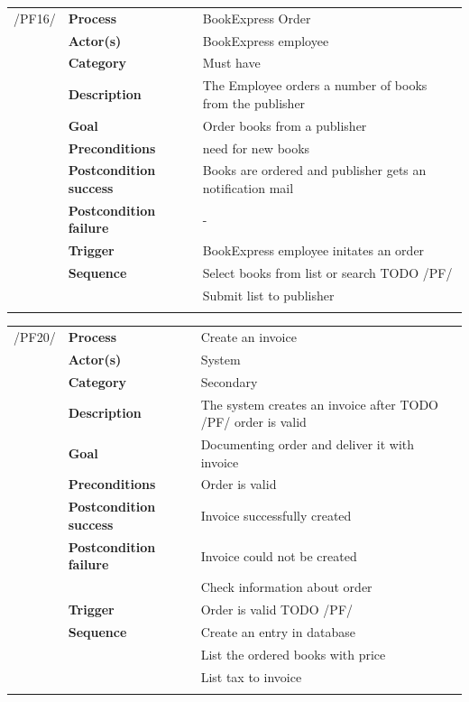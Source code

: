 \documentclass[11pt,a4paper,oneside,svgnames]{report}
\begin{document}
\noindent
\begin{tabular}{p{1.5cm}p{3cm}p{8cm}}
/PF16/	& \textbf{Process} & BookExpress Order\\
		& \textbf{Actor(s)} & BookExpress employee\\
		& \textbf{Category} & Must have\\
		& \textbf{Description}	 & The Employee orders a number of books from the publisher\\
		& \textbf{Goal} & Order books from a publisher\\
		& \textbf{Preconditions} & need for new books\\
		& \textbf{Postcondition success} & Books are ordered and publisher gets an notification mail\\
		& \textbf{Postcondition failure} & -\\
		& \textbf{Trigger} & BookExpress employee initates an order\\
		& \textbf{Sequence} & Select books from list or search TODO /PF/\\
		& & Submit list to publisher\\
		
\hfill \\
\end{tabular}

\noindent
\begin{tabular}{p{1.5cm}p{3cm}p{8cm}}
/PF20/	& \textbf{Process} & Create an invoice\\
		& \textbf{Actor(s)} & System\\
		& \textbf{Category} & Secondary\\
		& \textbf{Description}	 & The system creates an invoice after TODO /PF/ order is valid\\
		& \textbf{Goal} & Documenting order and deliver it with invoice\\
		& \textbf{Preconditions} & Order is valid\\
		& \textbf{Postcondition success} & Invoice successfully created\\
		& \textbf{Postcondition failure} & Invoice could not be created\\
		& & Check information about order\\
		& \textbf{Trigger} & Order is valid TODO /PF/\\
		& \textbf{Sequence} & Create an entry in database\\
		& & List the ordered books with price\\
		& & List tax to invoice\\
		
\hfill \\
\end{tabular}
\end{document}
